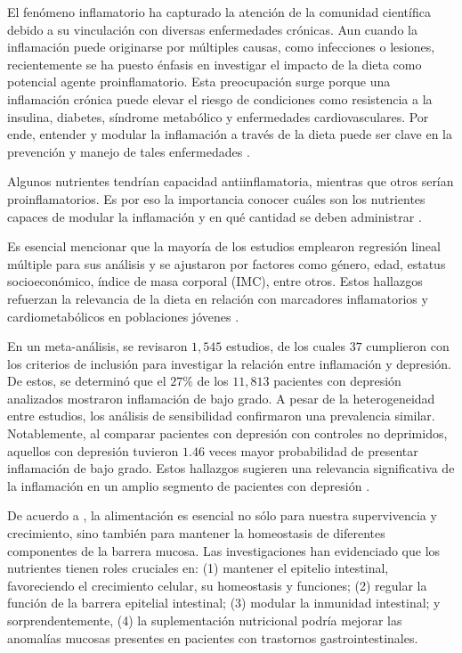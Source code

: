 \documentclass[stu, 12pt]{apa7}
\begin{document}
	El fenómeno inflamatorio ha capturado la atención de la comunidad
	científica debido a su vinculación con diversas enfermedades crónicas.
	Aun cuando la inflamación puede originarse por múltiples causas, como
	infecciones o lesiones, recientemente se ha puesto énfasis en investigar
	el impacto de la dieta como potencial agente proinflamatorio. Esta
	preocupación surge porque una inflamación crónica puede elevar el riesgo
	de condiciones como resistencia a la insulina, diabetes, síndrome
	metabólico y enfermedades cardiovasculares. Por ende, entender y modular
	la inflamación a través de la dieta puede ser clave en la prevención y
	manejo de tales enfermedades \parencites{daneshLowGradeInflammation2000}{ridkerHighsensitivityCreactiveProtein2004}{salas-salvadoConjugatedLinoleicAcid2006}.

	Algunos nutrientes tendrían capacidad antiinflamatoria, mientras que
	otros serían proinflamatorios. Es por eso la importancia conocer cuáles
	son los nutrientes capaces de modular la inflamación y en qué cantidad
	se deben administrar \parencite{giuglianoMetabolicCardiovascularEffects1997}.

	Es esencial mencionar que la mayoría de los estudios emplearon regresión
	lineal múltiple para sus análisis y se ajustaron por factores como
	género, edad, estatus socioeconómico, índice de masa corporal (IMC),
	entre otros. Estos hallazgos refuerzan la relevancia de la dieta en
	relación con marcadores inflamatorios y cardiometabólicos en poblaciones
	jóvenes \parencite{cotaCardiometabolicRiskHealth2021}.

	En un meta-análisis, se revisaron $1,545$ estudios, de los cuales $37$
	cumplieron con los criterios de inclusión para investigar la relación
	entre inflamación y depresión. De estos, se determinó que el $27\%$ de los
	$11,813$ pacientes con depresión analizados mostraron inflamación de bajo
	grado. A pesar de la heterogeneidad entre estudios, los análisis de
	sensibilidad confirmaron una prevalencia similar. Notablemente, al
	comparar pacientes con depresión con controles no deprimidos, aquellos
	con depresión tuvieron $1.46$ veces mayor probabilidad de presentar
	inflamación de bajo grado. Estos hallazgos sugieren una relevancia
	significativa de la inflamación en un amplio segmento de pacientes con
	depresión \parencite{Osimo2019}.

	De acuerdo a \parencite{Farre2020}, la alimentación es esencial no sólo
	para nuestra supervivencia y crecimiento, sino también para mantener la
	homeostasis de diferentes componentes de la barrera mucosa. Las
	investigaciones han evidenciado que los nutrientes tienen roles
	cruciales en: (1) mantener el epitelio intestinal, favoreciendo el
	crecimiento celular, su homeostasis y funciones; (2) regular la función
	de la barrera epitelial intestinal; (3) modular la inmunidad intestinal;
	y sorprendentemente, (4) la suplementación nutricional podría mejorar
	las anomalías mucosas presentes en pacientes con trastornos
	gastrointestinales.\\
\end{document}
